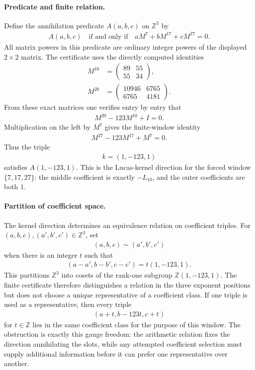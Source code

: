 \paragraph{Predicate and finite relation.}
Define the annihilation predicate $A(a,b,c)$ on $\mathbb{Z}^3$ by
$$
\begin{aligned}
A(a,b,c)\quad\text{if and only if}\quad aM^7+bM^{17}+cM^{27}=0.
\end{aligned}
$$
All matrix powers in this predicate are ordinary integer powers of the displayed $2\times 2$ matrix. The certificate uses the directly computed identities
$$
\begin{aligned}
M^{10}&=\begin{pmatrix}89&55\\55&34\end{pmatrix},\\
M^{20}&=\begin{pmatrix}10946&6765\\6765&4181\end{pmatrix}.
\end{aligned}
$$
From these exact matrices one verifies entry by entry that
$$
\begin{aligned}
M^{20}-123M^{10}+I=0.
\end{aligned}
$$
Multiplication on the left by $M^7$ gives the finite-window identity
$$
\begin{aligned}
M^{27}-123M^{17}+M^7=0.
\end{aligned}
$$
Thus the triple
$$
\begin{aligned}
k=(1,-123,1)
\end{aligned}
$$
satisfies $A(1,-123,1)$. This is the Lucas-kernel direction for the forced window $\{7,17,27\}$: the middle coefficient is exactly $-L_{10}$, and the outer coefficients are both $1$.

\paragraph{Partition of coefficient space.}
The kernel direction determines an equivalence relation on coefficient triples. For $(a,b,c),(a',b',c')\in\mathbb{Z}^3$, set
$$
\begin{aligned}
(a,b,c)\sim(a',b',c')
\end{aligned}
$$
when there is an integer $t$ such that
$$
\begin{aligned}
(a-a',b-b',c-c')=t(1,-123,1).
\end{aligned}
$$
This partitions $\mathbb{Z}^3$ into cosets of the rank-one subgroup $\mathbb{Z}(1,-123,1)$. The finite certificate therefore distinguishes a relation in the three exponent positions but does not choose a unique representative of a coefficient class. If one triple is used as a representative, then every triple
$$
\begin{aligned}
(a+t,b-123t,c+t)
\end{aligned}
$$
for $t\in\mathbb{Z}$ lies in the same coefficient class for the purpose of this window. The obstruction is exactly this gauge freedom: the arithmetic relation fixes the direction annihilating the slots, while any attempted coefficient selection must supply additional information before it can prefer one representative over another.

